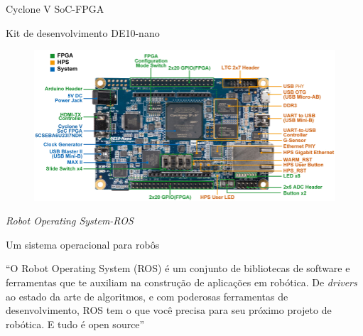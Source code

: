 \documentclass[10pt]{beamer}
\begin{document}
\begin{frame}{Cyclone V SoC-FPGA}
	\begin{alertblock}{Kit de desenvolvimento DE10-nano}
		\begin{figure}[h]
			\begin{center}
				\includegraphics[scale=1.45]{imagens/de10nano.png}\\
			\end{center}
			\label{fig:de10-nano}
		\end{figure}
	\end{alertblock}
\end{frame}

\begin{frame}{\textit{Robot Operating System-ROS}}
	\begin{alertblock}{Um sistema operacional para robôs}
		\vspace{0.1cm}
		\begin{justify}
			``O Robot Operating System (ROS) é um conjunto de bibliotecas de software e ferramentas que te auxiliam na construção de aplicações em robótica. De \textit{drivers} ao estado da arte de algoritmos, e com poderosas ferramentas de desenvolvimento, ROS tem o que você precisa para seu próximo projeto de robótica. E tudo é open source'' 
		\end{justify}
		

	\end{alertblock}
\end{frame}
\end{document}
